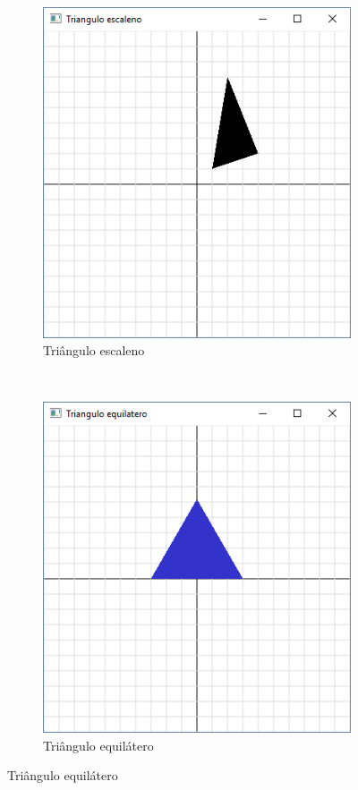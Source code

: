 \begin{enumerate}
\begin{figure}[h!]
\begin{subfigure}[t]{0.3\textwidth}
        \centerline{\includegraphics[width=.9\textwidth]{img/cap1_ex23b}}
        \caption{Triângulo escaleno}
        \label{fig:cap01_ex23b}
    \end{subfigure}
    ~
    \begin{subfigure}[t]{0.3\textwidth}
        \centerline{\includegraphics[width=.9\textwidth]{img/cap1_ex23c}}
        \caption{Triângulo equilátero}
        \label{fig:cap01_ex23c}
    \end{subfigure}

\end{figure}

\label{ex:cap01_ex23}

\end{enumerate}

